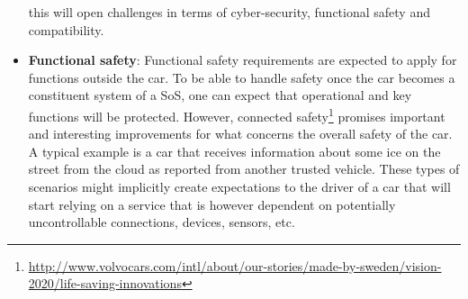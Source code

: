 \begin{itemize}
this will open challenges in terms of cyber-security, functional safety and compatibility. 
\item {\bf Functional safety}: Functional safety requirements are expected to apply for functions outside the car. To be able to handle safety once the car becomes a constituent system of a SoS, one can expect that operational and key functions will be protected. However, connected safety\footnote{\url{http://www.volvocars.com/intl/about/our-stories/made-by-sweden/vision-2020/life-saving-innovations}} promises important and interesting improvements for what concerns the overall safety of the car. A typical example is a car that receives information about some ice on the street from the cloud as reported from another trusted vehicle. These types of scenarios might implicitly create expectations to the driver of a car that will start relying on a service that is however dependent on potentially uncontrollable connections, devices, sensors, etc. 
\end{itemize}



%
%

